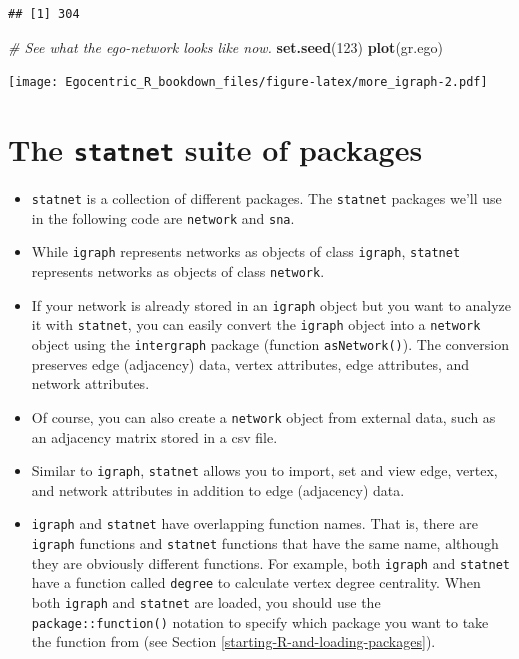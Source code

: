 \documentclass[
]{book}
\newenvironment{Shaded}{\begin{snugshade}}{\end{snugshade}}
\newcommand{\CommentTok}[1]{\textcolor[rgb]{0.56,0.35,0.01}{\textit{#1}}}
\newcommand{\DecValTok}[1]{\textcolor[rgb]{0.00,0.00,0.81}{#1}}
\newcommand{\FunctionTok}[1]{\textcolor[rgb]{0.13,0.29,0.53}{\textbf{#1}}}
\newcommand{\NormalTok}[1]{#1}
\providecommand{\tightlist}{%
  \setlength{\itemsep}{0pt}\setlength{\parskip}{0pt}}
\begin{document}
\begin{verbatim}
## [1] 304
\end{verbatim}

\begin{Shaded}
\begin{Highlighting}[]
\CommentTok{\# See what the ego{-}network looks like now.}
\FunctionTok{set.seed}\NormalTok{(}\DecValTok{123}\NormalTok{)}
\FunctionTok{plot}\NormalTok{(gr.ego)}
\end{Highlighting}
\end{Shaded}

\texttt{[image: Egocentric\_R\_bookdown\_files/figure-latex/more\_igraph-2.pdf]}

\hypertarget{statnet}{%
\section{\texorpdfstring{The \texttt{statnet} suite of packages}{The statnet suite of packages}}\label{statnet}}

\begin{itemize}
\tightlist
\item
  \texttt{statnet} is a collection of different packages. The \texttt{statnet} packages we'll use in the following code are \texttt{network} and \texttt{sna}.
\item
  While \texttt{igraph} represents networks as objects of class \texttt{igraph}, \texttt{statnet} represents networks as objects of class \texttt{network}.
\item
  If your network is already stored in an \texttt{igraph} object but you want to analyze it with \texttt{statnet}, you can easily convert the \texttt{igraph} object into a \texttt{network} object using the \texttt{intergraph} package (function \texttt{asNetwork()}). The conversion preserves edge (adjacency) data, vertex attributes, edge attributes, and network attributes.
\item
  Of course, you can also create a \texttt{network} object from external data, such as an adjacency matrix stored in a csv file.
\item
  Similar to \texttt{igraph}, \texttt{statnet} allows you to import, set and view edge, vertex, and network attributes in addition to edge (adjacency) data.
\item
  \texttt{igraph} and \texttt{statnet} have overlapping function names. That is, there are \texttt{igraph} functions and \texttt{statnet} functions that have the same name, although they are obviously different functions. For example, both \texttt{igraph} and \texttt{statnet} have a function called \texttt{degree} to calculate vertex degree centrality. When both \texttt{igraph} and \texttt{statnet} are loaded, you should use the \texttt{package::function()} notation to specify which package you want to take the function from (see Section \ref{starting-R-and-loading-packages}).
\end{itemize}
\end{document}
